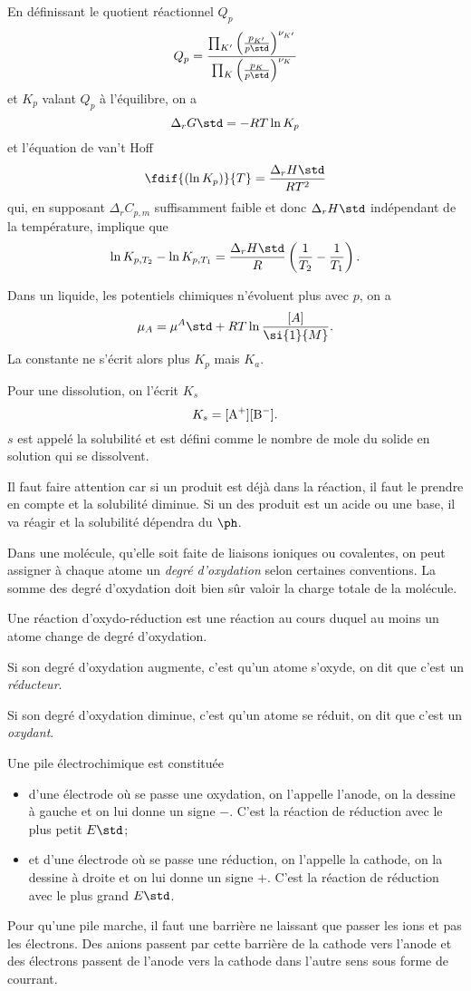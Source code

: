 En définissant le quotient réactionnel $Q_p$
\[ Q_p = \frac{\prod_{K'}\left(\frac{p_{K'}}{p\std}\right)^{\nu_{K'}}}
{\prod_{K}\left(\frac{p_{K}}{p\std}\right)^{\nu_{K}}} \]
et $K_p$ valant $Q_p$ à l'équilibre, on a
\[ \Delta_r G\std = -RT\ln K_p \]
et l'équation de van't Hoff
\[ \fdif{(\ln K_p)}{T} = \frac{\Delta_r H\std}{RT^2} \]
qui, en supposant $\Delta_r C_{p,m}$ suffisamment faible
et donc $\Delta_r H\std$ indépendant
de la température, implique que
\[ \ln K_{p,T_2}-\ln K_{p,T_1} =
\frac{\Delta_r H\std}{R}\left(\frac{1}{T_2} - \frac{1}{T_1}\right). \]

Dans un liquide, les potentiels chimiques n'évoluent plus avec $p$,
on a
\[ \mu_A = {\mu^A}\std + RT \ln \frac{[A]}{\si{1}{M}}. \]
La constante ne s'écrit alors plus $K_p$ mais $K_a$.

Pour une dissolution, on l'écrit $K_s$
\[ K_s = [\ce{A+}][\ce{B-}]. \]
$s$ est appelé la solubilité et est défini comme le nombre de mole
du solide en solution qui se dissolvent.

Il faut faire attention car si un produit est déjà dans la réaction,
il faut le prendre en compte et la solubilité diminue.
Si un des produit est un acide ou une base,
il va réagir et la solubilité dépendra du $\ph$.

Dans une molécule,
qu'elle soit faite de liaisons ioniques ou covalentes,
on peut assigner à chaque atome un \emph{degré d'oxydation}
selon certaines conventions.
La somme des degré d'oxydation doit bien sûr valoir la charge totale
de la molécule.

Une réaction d'oxydo-réduction est une réaction au cours duquel
au moins un atome change de degré d'oxydation.

Si son degré d'oxydation augmente, c'est qu'un atome s'oxyde,
on dit que c'est un \emph{réducteur}.

Si son degré d'oxydation diminue, c'est qu'un atome se réduit,
on dit que c'est un \emph{oxydant}.

Une pile électrochimique est constituée
\begin{itemize}
  \item d'une électrode où se passe
    une oxydation, on l'appelle l'anode, on la dessine à gauche et
    on lui donne un signe $-$.
    C'est la réaction de réduction avec le plus petit $E\std$;
  \item et d'une électrode où se passe
    une réduction, on l'appelle la cathode, on la dessine à droite et
    on lui donne un signe $+$.
    C'est la réaction de réduction avec le plus grand $E\std$.
\end{itemize}
Pour qu'une pile marche, il faut une barrière ne laissant que passer
les ions et pas les électrons.
Des anions passent par cette barrière de la cathode vers l'anode
et des électrons passent de l'anode vers la cathode dans l'autre sens
sous forme de courrant.

